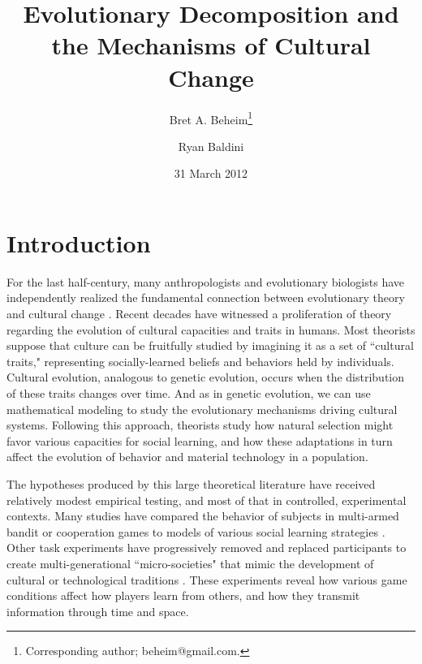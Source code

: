 \documentclass[11pt]{article}
\title{Evolutionary Decomposition and the Mechanisms of Cultural Change}
\author[,    1]{Bret A. Beheim\footnote{Corresponding author; beheim@gmail.com.}}
\author[1]{Ryan Baldini}
\affil[1]{Graduate Group in Ecology, Department of Environmental Science and Policy, University of California, Davis, USA}
\date{31 March 2012}
\begin{document}
\maketitle

\setlength{\parindent}{30pt}

\section{Introduction}

For the last half-century, many anthropologists and evolutionary biologists have independently realized the fundamental connection between evolutionary theory and cultural change \citep{campbell1965variation, cavallisforza1981cultural, boyd1985culture, durham1992coevolution, lumsden2005genes, dawkins2006selfish}. Recent decades have witnessed a proliferation of theory regarding the evolution of cultural capacities and traits in humans. Most theorists suppose that culture can be fruitfully studied by imagining it as a set of ``cultural traits," representing socially-learned beliefs and behaviors held by individuals. Cultural evolution, analogous to genetic evolution, occurs when the distribution of these traits changes over time. And as in genetic evolution, we can use mathematical modeling to study the evolutionary mechanisms driving cultural systems. Following this approach, theorists study how natural selection might favor various capacities for social learning, and how these adaptations in turn affect the evolution of behavior and material technology in a population. 

The hypotheses produced by this large theoretical literature have received relatively modest empirical testing, and most of that in controlled, experimental contexts. Many studies have compared the behavior of subjects in multi-armed bandit or cooperation games to models of various social learning strategies \citep{mcelreath2005applying, efferson2007learning, efferson2008conformists, mcelreath2008beyond, mesoudi2008cultural, eriksson2009people, rendell2011copying}. Other task experiments have progressively removed and replaced participants to create multi-generational ``micro-societies" that mimic the development of cultural or technological traditions \citep{baum2004cultural, caldwell2008studying}.  These experiments reveal how various game conditions affect how players learn from others, and how they transmit information through time and space.
\end{document}
